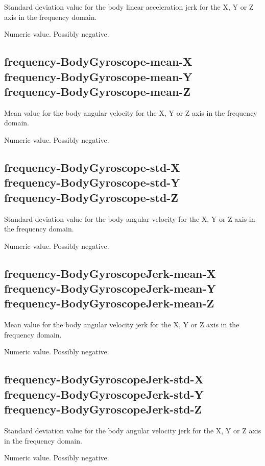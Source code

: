 \documentclass[a4paper,10pt]{report}
\begin{document}
Standard deviation value for the body linear acceleration jerk for the X, Y or Z axis in the frequency domain.

Numeric value. Possibly negative.

\subsection*{frequency-BodyGyroscope-mean-X\\frequency-BodyGyroscope-mean-Y\\frequency-BodyGyroscope-mean-Z} 

Mean value for the body angular velocity for the X, Y or Z axis in the frequency domain.

Numeric value. Possibly negative.

\subsection*{frequency-BodyGyroscope-std-X\\frequency-BodyGyroscope-std-Y\\frequency-BodyGyroscope-std-Z} 

Standard deviation value for the body angular velocity for the X, Y or Z axis in the frequency domain.

Numeric value. Possibly negative.

\subsection*{frequency-BodyGyroscopeJerk-mean-X\\frequency-BodyGyroscopeJerk-mean-Y\\frequency-BodyGyroscopeJerk-mean-Z} 

Mean value for the body angular velocity jerk for the X, Y or Z axis in the frequency domain.

Numeric value. Possibly negative.

\subsection*{frequency-BodyGyroscopeJerk-std-X\\frequency-BodyGyroscopeJerk-std-Y\\frequency-BodyGyroscopeJerk-std-Z} 

Standard deviation value for the body angular velocity jerk for the X, Y or Z axis in the frequency domain.

Numeric value. Possibly negative.
\end{document}
